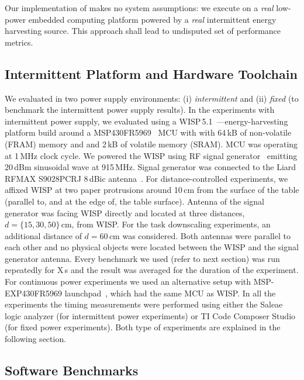 Our implementation of \sys makes no system assumptions: we execute \sys on a \emph{real} low-power embedded computing platform powered by a \emph{real} intermittent energy harvesting source. This approach shall lead to undisputed set of \sys performance metrics. 

\subsection{Intermittent Platform and Hardware Toolchain}
\label{sec:results_hardware_software}

We evaluated \sys in two power supply environments: (i)  \emph{intermittent} and (ii) \emph{fixed} (to benchmark the intermittent power supply results). In the experiments with intermittent power supply, we evaluated \sys using a WISP\,5.1~\cite{wisp5,wisp}---energy-harvesting platform build around a MSP430FR5969~\cite{wolverine} MCU with with 64\,kB of non-volatile (FRAM) memory and and 2\,kB of volatile memory (SRAM). MCU was operating at 1\,MHz clock cycle. We powered the WISP using RF signal generator~\cite{}  emitting 20\,dBm sinusoidal wave at 915\,MHz.  Signal generator was connected to the Liard RFMAX S9028PCRJ 8\,dBic antenna~\cite{atlas2015}. For distance-controlled experiments, we affixed WISP at two paper protrusions around 10\,cm from the surface of the table (parallel to, and at the edge of, the table surface). Antenna of the signal generator was facing WISP directly and located at three distances, $d=\{15, 30, 50\}$\,cm, from WISP. For the task downscaling experiments, an additional distance of $d=60$\,cm was considered. Both antennas were parallel to each other and no physical objects were located between the WISP and the signal generator antenna. Every benchmark we used (refer to next section) was run repeatedly for X\,s and the result was averaged for the duration of the experiment.  For continuous power experiments we used an alternative setup with MSP-EXP430FR5969 launchpad~\cite{MSP-EXP430FR5969_launchpad}, which had the same MCU as WISP. In all the experiments the timing measurements were performed using either the Saleae~\cite{saleae} logic analyzer (for intermittent power experiments) or TI Code Composer Studio (for fixed power experiments).  Both type of experiments are explained in the following section.

\subsection{Software Benchmarks}
\label{sec:software_benchmarks}

